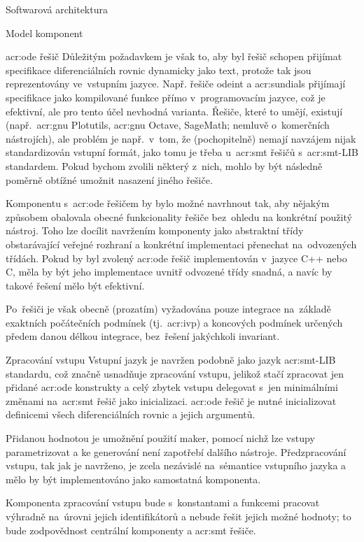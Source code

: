 \documentclass[thesis=M,czech]{FITthesis}[2012/06/26]
\newcommand{\acrlabel}[1]{acr:#1}
\newcommand{\acr}[1]{\acrshort{\acrlabel{#1}}}
\begin{document}
\begin{section}{Softwarová architektura}
\begin{subsection}{Model komponent}
\begin{subsubsection}{\acr{ode} řešič}
Důležitým požadavkem je však to,
aby byl řešič schopen přijímat
specifikace diferenciálních rovnic
dynamicky jako text,
protože tak jsou reprezentovány ve~vstupním jazyce.
Např. řešiče odeint a \acr{sundials}
přijímají specifikace jako kompilované funkce
přímo v~programovacím jazyce,
což je efektivní, ale pro tento účel
nevhodná varianta.
Řešiče, které to umějí, existují
(např.~\acr{gnu} Plotutils,
\acr{gnu} Octave, SageMath;
nemluvě o~komerčních nástrojích),
ale problém je např.~v~tom,
že (pochopitelně) nemají navzájem
nijak standardizován vstupní formát,
jako tomu je třeba u~\acr{smt} řešičů
s~\acr{smt}-LIB standardem.
Pokud bychom zvolili některý z~nich,
mohlo by být následně poměrně obtížné umožnit
nasazení jiného řešiče.

Komponentu s~\acr{ode} řešičem
by bylo možné navrhnout tak,
aby nějakým způsobem obalovala
obecné funkcionality řešiče
bez~ohledu na konkrétní použitý nástroj.
Toho lze docílit navržením komponenty
jako abstraktní třídy
obstarávající veřejné rozhraní
a konkrétní implementaci přenechat
na~odvozených třídách.
Pokud by byl zvolený \acr{ode} řešič
implementován v~jazyce C++ nebo C,
měla by být jeho implementace
uvnitř odvozené třídy snadná,
a navíc by takové řešení mělo být efektivní.

Po~řešiči je však obecně (prozatím) vyžadována
pouze integrace na~základě
exaktních počátečních podmínek (tj.~\acr{ivp})
a koncových podmínek
určených předem danou délkou integrace,
bez~řešení jakýchkoli invariant.
\end{subsubsection} %


\begin{subsubsection}{Zpracování vstupu}\label{sss:design:arch:comp:parse}
Vstupní jazyk je navržen podobně
jako jazyk \acr{smt}-LIB standardu,
což značně usnadňuje zpracování vstupu,
jelikož stačí zpracovat jen přidané \acr{ode} konstrukty
a celý zbytek vstupu delegovat s~jen minimálními změnami
na~\acr{smt} řešič jako inicializaci.
\acr{ode} řešič je nutné inicializovat
definicemi všech diferenciálních rovnic
a jejich argumentů.

Přidanou hodnotou je umožnění použití maker,
pomocí nichž lze vstupy parametrizovat
a ke generování není zapotřebí dalšího nástroje.
Předzpracování vstupu, tak jak je navrženo,
je zcela nezávislé
na~sémantice vstupního jazyka
a mělo by být implementováno jako samostatná komponenta.

Komponenta zpracování vstupu bude s~konstantami a funkcemi
pracovat výhradně na~úrovni jejich identifikátorů
a nebude řešit jejich možné hodnoty;
to bude zodpovědnost centrální komponenty
a \acr{smt} řešiče.
\end{subsubsection} %


\end{subsection}
\end{section}
\end{document}
